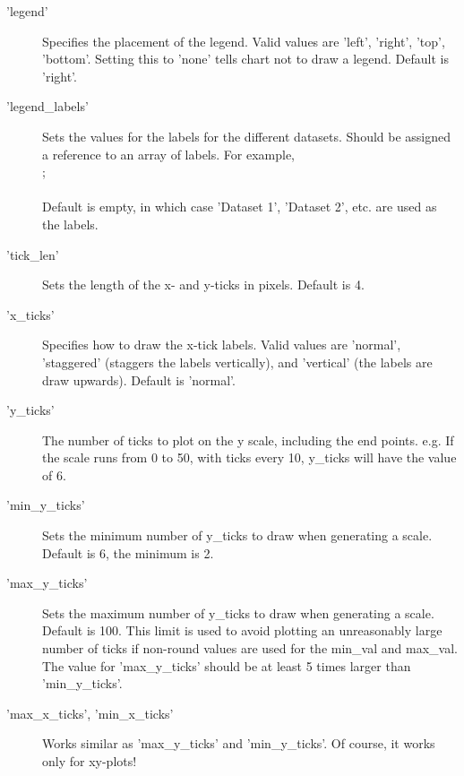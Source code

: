 \begin{description}
\item['legend']Specifies the placement of the legend.  
             Valid values are 'left', 'right', 'top', 'bottom'.  
             Setting this to 'none' tells chart not to draw a legend.  Default is 'right'.

\item['legend\_labels']
            Sets the values for the labels for the different datasets. 
            Should be assigned a reference to an array of labels.  For example,\\
            ;\\
            \\
            Default is empty, in which case 'Dataset 1', 'Dataset 2', etc.
             are used as the labels.
             
\item['tick\_len']Sets the length of the x- and y-ticks in pixels.  Default is 4.

\item['x\_ticks']Specifies how to draw the x-tick labels.  
        Valid values are 'normal', 'staggered' (staggers the labels vertically), 
        and 'vertical' (the labels are draw upwards).  Default is 'normal'.

\item['y\_ticks']The number of ticks to plot on the y scale, 
      including the end points. e.g. If the scale runs from 0 to 50,
			with ticks every 10, y\_ticks will have the value of 6.

\item['min\_y\_ticks']Sets the minimum number of y\_ticks to draw when generating a scale. 
        Default is 6, the minimum is 2.
        
\item['max\_y\_ticks']Sets the maximum number of y\_ticks to draw when generating a scale. 
       Default is 100. This limit is used to avoid plotting an unreasonably 
       large number of ticks if non-round values are used for the min\_val and
       max\_val.\\[\itemabstand]
       The value for 'max\_y\_ticks' should be at least 5 times larger than 'min\_y\_ticks'.
       
\item['max\_x\_ticks', 'min\_x\_ticks'] Works similar as 'max\_y\_ticks' and 'min\_y\_ticks'. 
      Of course, it works only for xy-plots! 


\end{description}
